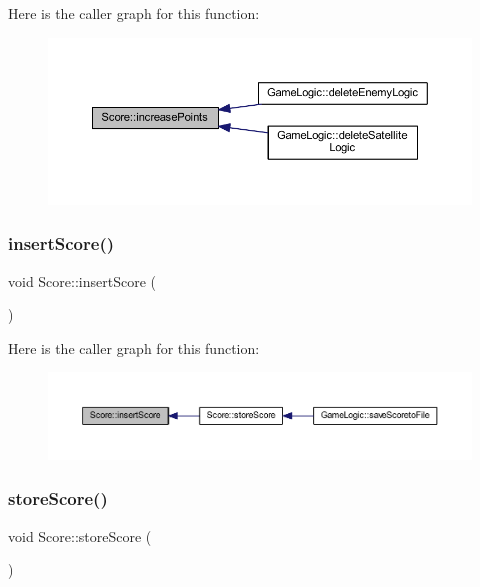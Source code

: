 Here is the caller graph for this function\+:
\nopagebreak
\begin{figure}[H]
\begin{center}
\leavevmode
\includegraphics[width=350pt]{class_score_a017f4ad80df1e9d51e62789d8e5e9605_icgraph}
\end{center}
\end{figure}
\mbox{\label{class_score_ab207e77378c558c261526487aa725db9}} 
\subsubsection{\texorpdfstring{insert\+Score()}{insertScore()}}
{\footnotesize\ttfamily void Score\+::insert\+Score (\begin{DoxyParamCaption}{ }\end{DoxyParamCaption})}

Here is the caller graph for this function\+:
\nopagebreak
\begin{figure}[H]
\begin{center}
\leavevmode
\includegraphics[width=350pt]{class_score_ab207e77378c558c261526487aa725db9_icgraph}
\end{center}
\end{figure}
\mbox{\label{class_score_a8cc9e62ee4d086c0f2e1b8ef6d2cbf8d}} 
\subsubsection{\texorpdfstring{store\+Score()}{storeScore()}}
{\footnotesize\ttfamily void Score\+::store\+Score (\begin{DoxyParamCaption}{ }\end{DoxyParamCaption})}



